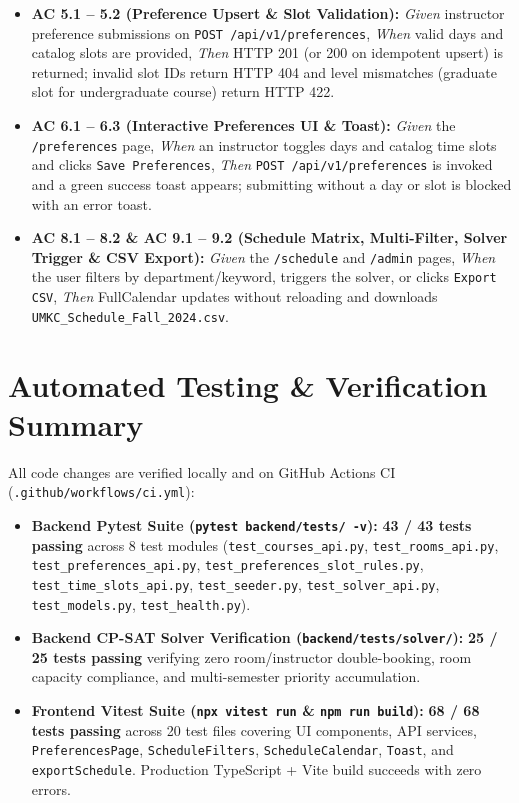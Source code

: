\documentclass[10pt,letterpaper]{article}
\begin{document}
\begin{itemize}[leftmargin=1.5em, itemsep=3pt, topsep=3pt]
    \item \textbf{AC 5.1 -- 5.2 (Preference Upsert \& Slot Validation):} \textit{Given} instructor preference submissions on \texttt{POST /api/v1/preferences}, \textit{When} valid days and catalog slots are provided, \textit{Then} HTTP 201 (or 200 on idempotent upsert) is returned; invalid slot IDs return HTTP 404 and level mismatches (graduate slot for undergraduate course) return HTTP 422.
    \item \textbf{AC 6.1 -- 6.3 (Interactive Preferences UI \& Toast):} \textit{Given} the \texttt{/preferences} page, \textit{When} an instructor toggles days and catalog time slots and clicks \texttt{Save Preferences}, \textit{Then} \texttt{POST /api/v1/preferences} is invoked and a green success toast appears; submitting without a day or slot is blocked with an error toast.
    \item \textbf{AC 8.1 -- 8.2 \& AC 9.1 -- 9.2 (Schedule Matrix, Multi-Filter, Solver Trigger \& CSV Export):} \textit{Given} the \texttt{/schedule} and \texttt{/admin} pages, \textit{When} the user filters by department/keyword, triggers the solver, or clicks \texttt{Export CSV}, \textit{Then} FullCalendar updates without reloading and downloads \texttt{UMKC\_Schedule\_Fall\_2024.csv}.
\end{itemize}

\section{Automated Testing \& Verification Summary}

All code changes are verified locally and on GitHub Actions CI (\texttt{.github/workflows/ci.yml}):
\begin{itemize}[leftmargin=1.5em, itemsep=2pt, topsep=3pt]
    \small
    \item \textbf{Backend Pytest Suite (\texttt{pytest backend/tests/ -v}):} \textbf{43 / 43 tests passing} across 8 test modules (\texttt{test\_courses\_api.py}, \texttt{test\_rooms\_api.py}, \texttt{test\_preferences\_api.py}, \texttt{test\_preferences\_slot\_rules.py}, \texttt{test\_time\_slots\_api.py}, \texttt{test\_seeder.py}, \texttt{test\_solver\_api.py}, \texttt{test\_models.py}, \texttt{test\_health.py}).
    \item \textbf{Backend CP-SAT Solver Verification (\texttt{backend/tests/solver/}):} \textbf{25 / 25 tests passing} verifying zero room/instructor double-booking, room capacity compliance, and multi-semester priority accumulation.
    \item \textbf{Frontend Vitest Suite (\texttt{npx vitest run} \& \texttt{npm run build}):} \textbf{68 / 68 tests passing} across 20 test files covering UI components, API services, \texttt{PreferencesPage}, \texttt{ScheduleFilters}, \texttt{ScheduleCalendar}, \texttt{Toast}, and \texttt{exportSchedule}. Production TypeScript + Vite build succeeds with zero errors.
\end{itemize}
\end{document}
